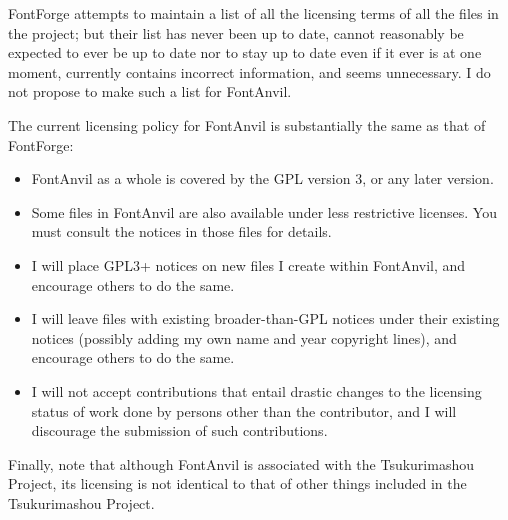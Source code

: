 \documentclass[11pt]{report}
\begin{document}
FontForge attempts to maintain a list of all the licensing terms of all the
files in the project; but their list has never been up to date, cannot
reasonably be expected to ever be up to date nor to stay up to date even if
it ever is at one moment, currently contains incorrect information, and
seems unnecessary.  I do not propose to make such a list for FontAnvil.

The current licensing policy for FontAnvil is substantially the same as that
of FontForge:
\begin{itemize}
\item FontAnvil as a whole is covered by the GPL version 3, or any later
version.
\item Some files in FontAnvil are also available under less restrictive
licenses.  You must consult the notices in those files for details.
\item I will place GPL3+ notices on new files I create within FontAnvil,
and encourage others to do the same.
\item I will leave files with existing broader-than-GPL notices under their
existing notices (possibly adding my own name and year copyright lines), and
encourage others to do the same.
\item I will not accept contributions that entail drastic changes to the
licensing status of work done by persons other than the contributor, and I
will discourage the submission of such contributions.
\end{itemize}

Finally, note that although FontAnvil is associated with the Tsukurimashou
Project, its licensing is not identical to that of other things included in
the Tsukurimashou Project.
\clearpage

\end{document}
